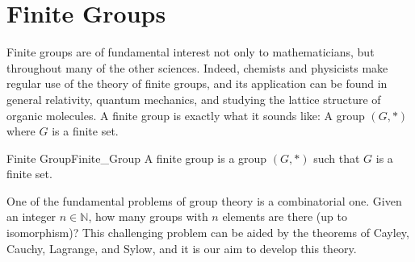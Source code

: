     \chapter{Finite Groups}
        Finite groups are of fundamental interest not only to mathematicians,
        but throughout many of the other sciences. Indeed, chemists and
        physicists make regular use of the theory of finite groups, and its
        application can be found in general relativity, quantum mechanics, and
        studying the lattice structure of organic molecules. A finite group is
        exactly what it sounds like: A group $(G,*)$ where $G$ is a finite set.
        \begin{fdefinition}{Finite Group}{Finite_Group}
            A finite group is a \gls{group} $(G,*)$ such that $G$ is a
            finite set.
        \end{fdefinition}
        One of the fundamental problems of group theory is a combinatorial one.
        Given an integer $n\in\mathbb{N}$, how many groups with $n$ elements are
        there (up to isomorphism)? This challenging problem can be aided by the
        theorems of Cayley, Cauchy, Lagrange, and Sylow, and it is our aim to
        develop this theory.
        
        
    \renewcommand{\PATH}{\OLDPATH}
\endgroup
